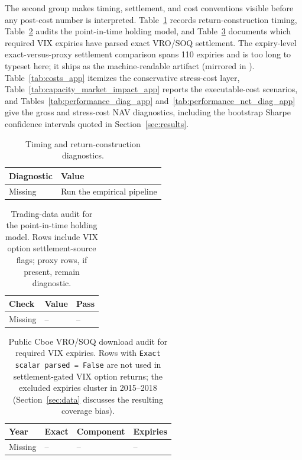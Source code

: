 The second group makes timing, settlement, and cost conventions visible before any
post-cost number is interpreted. Table~\ref{tab:timing_app} records return-construction
timing, Table~\ref{tab:trading_audit_app} audits the point-in-time holding model, and
Table~\ref{tab:vix_download_audit_app} documents which required VIX expiries have parsed
exact VRO/SOQ settlement. The expiry-level exact-versus-proxy settlement comparison spans
110 expiries and is too long to typeset here; it ships as the machine-readable artifact
 (mirrored in
). Table~\ref{tab:costs_app} itemizes the
conservative stress-cost layer, Table~\ref{tab:capacity_market_impact_app} reports the
executable-cost scenarios, and Tables~\ref{tab:performance_diag_app}
and~\ref{tab:performance_net_diag_app} give the gross and stress-cost NAV diagnostics,
including the bootstrap Sharpe confidence intervals quoted in Section~\ref{sec:results}.

\begin{table}[H]
\centering
\scriptsize
{}
  {\resizebox{0.92\textwidth}{!}{}}
  {\begin{tabular}{ll}\toprule Diagnostic & Value \\\midrule Missing & Run the empirical pipeline \\\bottomrule\end{tabular}}
\caption{Timing and return-construction diagnostics.}
\label{tab:timing_app}
\end{table}

\begin{table}[H]
\centering
\scriptsize
{}
  {\resizebox{\textwidth}{!}{}}
  {\begin{tabular}{lll}\toprule Check & Value & Pass \\\midrule Missing & -- & -- \\\bottomrule\end{tabular}}
\caption{Trading-data audit for the point-in-time holding model. Rows include VIX option
settlement-source flags; proxy rows, if present, remain diagnostic.}
\label{tab:trading_audit_app}
\end{table}

\begin{table}[H]
\centering
\scriptsize
{}
  {\resizebox{0.86\textwidth}{!}{}}
  {\begin{tabular}{llll}\toprule Year & Exact & Component & Expiries \\\midrule Missing & -- & -- & -- \\\bottomrule\end{tabular}}
\caption{Public Cboe VRO/SOQ download audit for required VIX expiries. Rows with
\texttt{Exact scalar parsed = False} are not used in settlement-gated VIX option returns;
the excluded expiries cluster in 2015--2018 (Section~\ref{sec:data} discusses the resulting coverage
bias).}
\label{tab:vix_download_audit_app}
\end{table}

